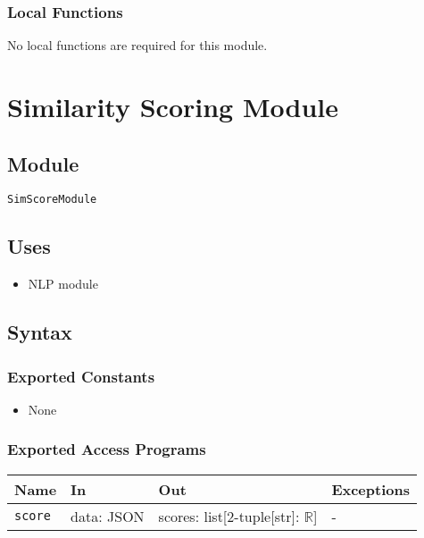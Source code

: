 \documentclass[12pt, titlepage]{article}
\begin{document}
\subsubsection{Local Functions}
No local functions are required for this module.

\section{Similarity Scoring Module} \label{mScoring}

\subsection{Module}

\texttt{SimScoreModule}

\subsection{Uses}

\begin{itemize}
    \item NLP module
\end{itemize}

\subsection{Syntax}

\subsubsection{Exported Constants}

\begin{itemize}
    \item None
\end{itemize}

\subsubsection{Exported Access Programs}

\begin{center}
\begin{tabular}{p{5cm} p{3.5cm} p{3.5cm} p{2cm}}
\hline
\textbf{Name} & \textbf{In} & \textbf{Out} & \textbf{Exceptions} \\
\hline
\texttt{score} & data: JSON & scores: list[2-tuple[str]: $\mathbb{R}$] & - \\ %
\hline
\end{tabular}
\end{center}
\end{document}
